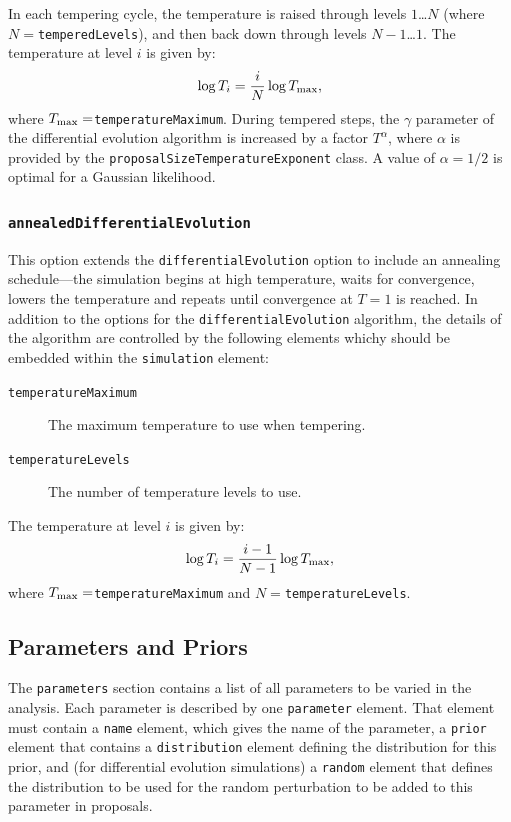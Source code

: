 In each tempering cycle, the temperature is raised through levels $1$\ldots$N$ (where $N=${\tt temperedLevels}), and then back down through levels $N-1$\ldots$1$. The temperature at level $i$ is given by:
\begin{equation}
\log T_i = {i \over N} \log T_{\rm max},
\end{equation}
where $T_{\rm max}=${\tt temperatureMaximum}. During tempered steps, the $\gamma$ parameter of the differential evolution algorithm is increased by a factor $T^\alpha$, where $\alpha$ is provided by the {\tt proposalSizeTemperatureExponent} class. A value of $\alpha=1/2$ is optimal for a Gaussian likelihood.

\subsubsection{{\tt annealedDifferentialEvolution}}

This option extends the {\tt differentialEvolution} option to include an annealing schedule---the simulation begins at high temperature, waits for convergence, lowers the temperature and repeats until convergence at $T=1$ is reached. In addition to the options for the {\tt differentialEvolution} algorithm, the details of the algorithm are controlled by the following elements whichy should be embedded within the {\tt simulation} element:
\begin{description}
\item[{\tt temperatureMaximum}] The maximum temperature to use when tempering.
\item[{\tt temperatureLevels}] The number of temperature levels to use.
\end{description}

The temperature at level $i$ is given by:
\begin{equation}
\log T_i = {i-1 \over N-1} \log T_{\rm max},
\end{equation}
where $T_{\rm max}=${\tt temperatureMaximum} and $N=${\tt temperatureLevels}.

\subsection{Parameters and Priors}\label{sec:ParametersPriors}

The {\tt parameters} section contains a list of all parameters to be varied in the analysis. Each parameter is described by one {\tt parameter} element. That element must contain a {\tt name} element, which gives the name of the parameter, a {\tt prior} element that contains a {\tt distribution} element defining the distribution for this prior, and (for differential evolution simulations) a {\tt random} element that defines the distribution to be used for the random perturbation to be added to this parameter in proposals.

